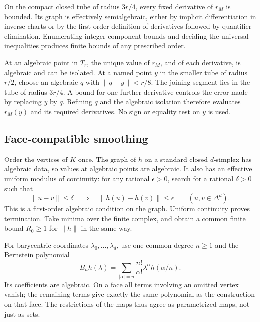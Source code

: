 On the compact closed tube of radius $3r/4$, every fixed derivative
of $r_M$ is bounded. Its graph is effectively semialgebraic, either
by implicit differentiation in inverse charts or by the first-order
definition of derivatives followed by quantifier elimination.
Enumerating integer component bounds and deciding the universal
inequalities produces finite bounds of any prescribed order.

At an algebraic point in $T_r$, the unique value of $r_M$, and of
each derivative, is algebraic and can be isolated. At a named point
$y$ in the smaller tube of radius $r/2$, choose an algebraic
$q$ with $\|q-y\|<r/8$. The joining segment lies in the tube
of radius $3r/4$. A bound for one further derivative controls the
error made by replacing $y$ by $q$. Refining $q$ and the algebraic
isolation therefore evaluates $r_M(y)$ and its required derivatives.
No sign or equality test on $y$ is used.

\subsection{Face-compatible smoothing}

Order the vertices of $K$ once. The graph of $h$ on a standard
closed $d$-simplex has algebraic data, so values at algebraic points
are algebraic. It also has an effective uniform modulus of
continuity: for any rational $\epsilon>0$, search for a rational
$\delta>0$ such that
\begin{equation}\label{eq:triangulation-modulus}
 \|u-v\|\le\delta\quad\Longrightarrow\quad
             \|h(u)-h(v)\|\le\epsilon
             \qquad (u,v\in\Delta^d).
\end{equation}
This is a first-order algebraic condition on the graph. Uniform
continuity proves termination. Take minima over the finite complex,
and obtain a common finite bound $R_0\ge1$ for $\|h\|$ in the
same way.

For barycentric coordinates $\lambda_0,\ldots,\lambda_d$, use
one common degree $n\ge1$ and the Bernstein polynomial
\begin{equation}\label{eq:bernstein-map}
 B_nh(\lambda)=\sum_{|\alpha|=n}
                 \frac{n!}{\alpha!}\lambda^\alpha h(\alpha/n).
\end{equation}
Its coefficients are algebraic. On a face all terms involving an
omitted vertex vanish; the remaining terms give exactly the same
polynomial as the construction on that face. The restrictions of
the maps thus agree as parametrized maps, not just as sets.

